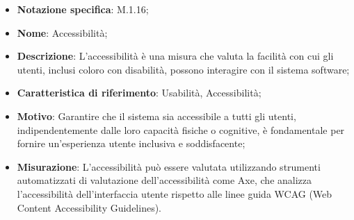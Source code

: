 \begin{itemize}
    \item \textbf{Notazione specifica}: M.1.16;
    \item \textbf{Nome}: Accessibilità;
    \item \textbf{Descrizione}: L'accessibilità è una misura che valuta la facilità con cui gli utenti, inclusi coloro con disabilità, possono interagire con il sistema software;
    \item \textbf{Caratteristica di riferimento}: Usabilità, Accessibilità;
    \item \textbf{Motivo}: Garantire che il sistema sia accessibile a tutti gli utenti, indipendentemente dalle loro capacità fisiche o cognitive, è fondamentale per fornire un'esperienza utente inclusiva e soddisfacente;
    \item \textbf{Misurazione}: L'accessibilità può essere valutata utilizzando strumenti automatizzati di valutazione dell'accessibilità come Axe, che analizza l'accessibilità dell'interfaccia utente rispetto alle linee guida WCAG (Web Content Accessibility Guidelines).
\end{itemize}
